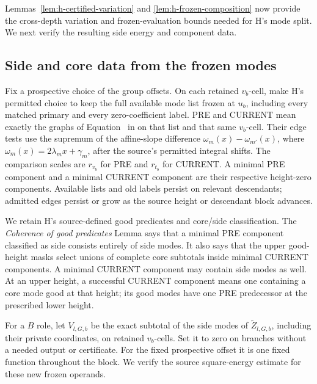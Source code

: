 Lemmas~\ref{lem:h-certified-variation} and
\ref{lem:h-frozen-composition} now provide the cross-depth
variation and frozen-evaluation bounds needed for H's mode split.
We next verify the resulting side energy and component data.

\subsection{Side and core data from the frozen modes}

Fix a prospective choice of the group offsets.  On each retained \(v_b\)-cell, make
H's permitted choice to keep the full available mode list frozen
at \(u_b\), including every matched primary and every
zero-coefficient label.  PRE and CURRENT mean exactly the graphs
of Equation~ in \cite[Section~8]{H} on that list and that
same \(v_b\)-cell.  Their edge tests use the supremum of the
affine-slope difference
\(\omega_m(x)-\omega_{m'}(x)\), where
\(\omega_m(x)=2\lambda_mx+\gamma_m\), after the source's permitted
integral shifts.  The comparison scales are \(r_{v_b}\) for PRE
and \(r_{t_b}\) for CURRENT.  A minimal PRE component and a minimal
CURRENT component are their respective height-zero components.
Available lists and old labels persist on relevant descendants;
admitted edges persist or grow as the source height or descendant
block advances.

We retain H's source-defined good predicates and core/side
classification.  The \emph{Coherence of good predicates} Lemma
says that a minimal PRE component classified as side consists
entirely of side modes.  It also says that the upper good-height
masks select unions of complete core subtotals inside minimal
CURRENT components.  A minimal CURRENT component may contain
side modes as well.  At an upper height, a successful CURRENT
component means one containing a core mode good at that height;
its good modes have one PRE predecessor at the prescribed lower
height.

For a \(B\) role, let \(V_{l,G,b}\) be the exact subtotal of the
side modes of \(\widetilde Z_{l,G,b}\), including their private
coordinates, on retained \(v_b\)-cells.  Set it to zero on branches
without a needed output or certificate.  For the fixed prospective
offset it is one fixed function throughout the block.  We verify
the source square-energy estimate for these new frozen operands.


